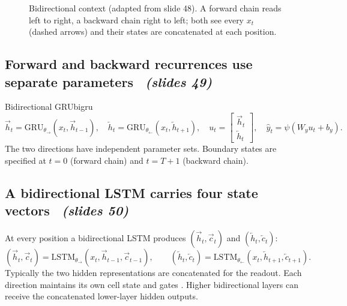 \documentclass[11pt,a4paper]{article}
\newcommand{\sltag}[1]{\texorpdfstring{\ \emph{(slides #1)}}{ (slides #1)}}
\begin{document}
\begin{figure}[H]\centering
{}
\caption{Bidirectional context (adapted from slide 48). A forward chain reads left to right, a backward chain right to left; both see every $x_t$ (dashed arrows) and their states are concatenated at each position.}
\end{figure}

\subsection{Forward and backward recurrences use separate parameters \sltag{49}}

\begin{definition}{Bidirectional GRU}{bigru}
\[
\overrightarrow h_t=\mathrm{GRU}_{\theta_\to}(x_t,\overrightarrow h_{t-1}),\quad
\overleftarrow h_t=\mathrm{GRU}_{\theta_\leftarrow}(x_t,\overleftarrow h_{t+1}),\quad
u_t=\begin{bmatrix}\overrightarrow h_t\\ \overleftarrow h_t\end{bmatrix},\quad\hat y_t=\psi(W_yu_t+b_y).
\]
The two directions have independent parameter sets. Boundary states are specified at $t=0$ (forward chain) and $t=T+1$ (backward chain).
\end{definition}

\subsection{A bidirectional LSTM carries four state vectors \sltag{50}}

At every position a bidirectional LSTM produces $(\overrightarrow h_t,\overrightarrow c_t)$ and $(\overleftarrow h_t,\overleftarrow c_t)$:
\[
(\overrightarrow h_t,\overrightarrow c_t)=\mathrm{LSTM}_{\theta_\to}(x_t,\overrightarrow h_{t-1},\overrightarrow c_{t-1}),\qquad
(\overleftarrow h_t,\overleftarrow c_t)=\mathrm{LSTM}_{\theta_\leftarrow}(x_t,\overleftarrow h_{t+1},\overleftarrow c_{t+1}).
\]
Typically the two hidden representations are concatenated for the readout. Each direction maintains its own cell state and gates \cite{r8}. Higher bidirectional layers can receive the concatenated lower-layer hidden outputs.
\end{document}
